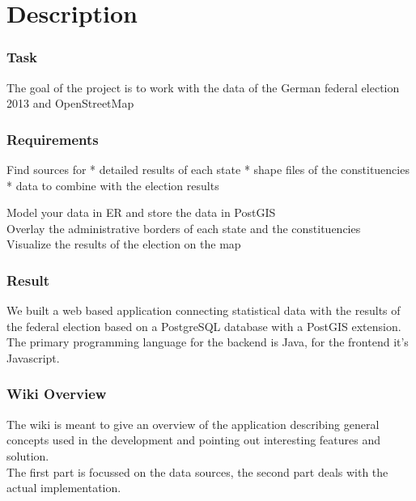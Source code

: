 
\section{Description}

\subsubsection{Task}\label{task}

The goal of the project is to work with the data of the German federal
election 2013 and OpenStreetMap

\subsubsection{Requirements}\label{requirements}

Find sources for * detailed results of each state * shape files of the
constituencies * data to combine with the election results

Model your data in ER and store the data in PostGIS\\Overlay the
administrative borders of each state and the constituencies\\Visualize
the results of the election on the map

\subsubsection{Result}\label{result}

We built a web based application connecting statistical data with the
results of the federal election based on a PostgreSQL database with a
PostGIS extension. The primary programming language for the backend is
Java, for the frontend it's Javascript.

\subsubsection{Wiki Overview}\label{wiki-overview}

The wiki is meant to give an overview of the application describing
general concepts used in the development and pointing out interesting
features and solution.\\The first part is focussed on the data sources,
the second part deals with the actual implementation.